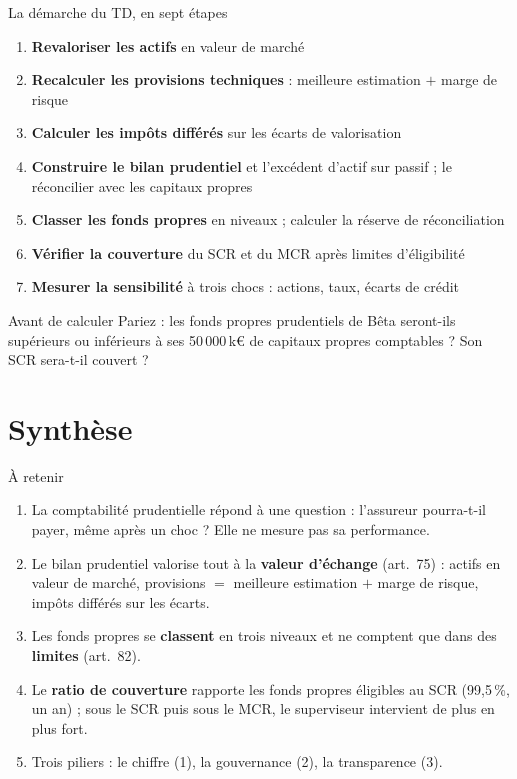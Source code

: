 \documentclass[10pt,aspectratio=169]{beamer}
\newcommand{\keur}{\,k\euro}
\begin{document}
\begin{frame}{La démarche du TD, en sept étapes}
\begin{enumerate}
  \item \textbf{Revaloriser les actifs} en valeur de marché
  \item \textbf{Recalculer les provisions techniques} : meilleure estimation $+$ marge de risque
  \item \textbf{Calculer les impôts différés} sur les écarts de valorisation
  \item \textbf{Construire le bilan prudentiel} et l'excédent d'actif sur passif ; le réconcilier avec les capitaux propres
  \item \textbf{Classer les fonds propres} en niveaux ; calculer la réserve de réconciliation
  \item \textbf{Vérifier la couverture} du SCR et du MCR après limites d'éligibilité
  \item \textbf{Mesurer la sensibilité} à trois chocs : actions, taux, écarts de crédit
\end{enumerate}
\vspace{0.2cm}
\begin{alertblock}{Avant de calculer}
Pariez : les fonds propres prudentiels de Bêta seront-ils supérieurs ou inférieurs à ses
50\,000\keur{} de capitaux propres comptables ? Son SCR sera-t-il couvert ?
\end{alertblock}
\end{frame}

\section{Synthèse}

\begin{frame}{À retenir}
\begin{enumerate}
  \item La comptabilité prudentielle répond à une question : l'assureur pourra-t-il payer, même
        après un choc ? Elle ne mesure pas sa performance.
  \item Le bilan prudentiel valorise tout à la \textbf{valeur d'échange} (art.~75) : actifs en valeur
        de marché, provisions $=$ meilleure estimation $+$ marge de risque, impôts différés sur les écarts.
  \item Les fonds propres se \textbf{classent} en trois niveaux et ne comptent que dans des
        \textbf{limites} (art.~82).
  \item Le \textbf{ratio de couverture} rapporte les fonds propres éligibles au SCR (99,5\,\%, un an) ;
        sous le SCR puis sous le MCR, le superviseur intervient de plus en plus fort.
  \item Trois piliers : le chiffre (1), la gouvernance (2), la transparence (3).
\end{enumerate}
\end{frame}
\end{document}
